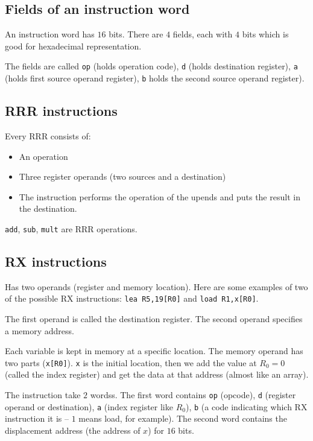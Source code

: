\subsection{Fields of an instruction word}\label{sub:fields_of_an_instruction_word}

An instruction word has \(16\) bits.
There are \(4\) fields, each with \(4\) bits which is good for hexadecimal representation.

The fields are called \texttt{op} (holds operation code), \texttt{d} (holds destination register), \texttt{a} (holds first source operand register), \texttt{b} holds the second source operand register).

\subsection{RRR instructions}\label{sub:rrr_instructions}

Every RRR consists of:
\begin{itemize}
	\item An operation
	\item Three register operands (two sources and a destination)
	\item The instruction performs the operation of the upends and puts the result in the destination.
\end{itemize}

\texttt{add}, \texttt{sub}, \texttt{mult} are RRR operations.

\subsection{RX instructions}\label{sub:rx_instructions}

Has two operands (register and memory location).
Here are some examples of two of the possible RX instructions:
\texttt{lea R5,19[R0]} and \texttt{load R1,x[R0]}.

The first operand is called the destination register.
The second operand specifies a memory address.

Each variable is kept in memory at a specific location.
The memory operand has two parts (\texttt{x[R0]}).
\texttt{x} is the initial location, then we add the value at \(R_0 = 0\) (called the index register) and get the data at that address (almost like an array).

The instruction take \(2\) wordss.
The first word contains \texttt{op} (opcode), \texttt{d} (register operand or destination), \texttt{a} (index register like \(R_0\)), \texttt{b} (a code indicating which RX instruction it is -- \(1\) means load, for example).
The second word contains the displacement address (the address of \(x\)) for \(16\) bits.
